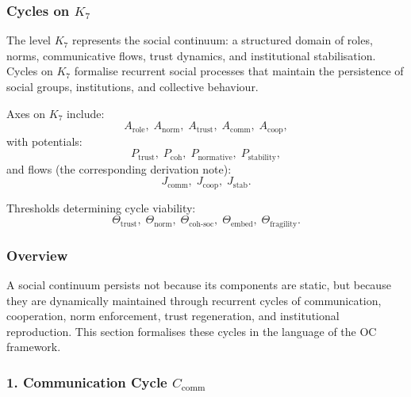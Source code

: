 
\subsubsection{Cycles on \texorpdfstring{$K_7$}{K_7}}
\label{sec:cycles-k7}

The level $K_7$ represents the social continuum: a structured domain of
roles, norms, communicative flows, trust dynamics, and institutional
stabilisation.  
Cycles on $K_7$ formalise recurrent social processes that maintain the
persistence of social groups, institutions, and collective behaviour.

Axes on $K_7$ include:
\[
  A_{\mathrm{role}},\;
  A_{\mathrm{norm}},\;
  A_{\mathrm{trust}},\;
  A_{\mathrm{comm}},\;
  A_{\mathrm{coop}},
\]
with potentials:
\[
  P_{\mathrm{trust}},\;
  P_{\mathrm{coh}},\;
  P_{\mathrm{normative}},\;
  P_{\mathrm{stability}},
\]
and flows (the corresponding derivation note):
\[
  J_{\mathrm{comm}},\;
  J_{\mathrm{coop}},\;
  J_{\mathrm{stab}}.
\]

Thresholds determining cycle viability:
\[
  \Theta_{\mathrm{trust}},\;
  \Theta_{\mathrm{norm}},\;
  \Theta_{\mathrm{coh\text{-}soc}},\;
  \Theta_{\mathrm{embed}},\;
  \Theta_{\mathrm{fragility}}.
\]

\subsubsection{Overview}

A social continuum persists not because its components are static, but because
they are dynamically maintained through recurrent cycles of communication,
cooperation, norm enforcement, trust regeneration, and institutional
reproduction.  
This section formalises these cycles in the language of the OC framework.

\subsubsection{1. Communication Cycle $C_{\mathrm{comm}}$}

